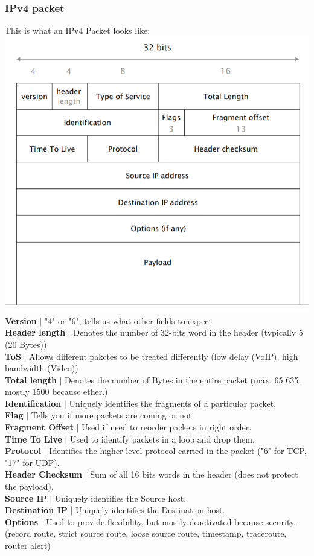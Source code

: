\documentclass[a4paper, fontsize=8pt, landscape, DIV=1]{scrartcl}
\begin{document}
\begin{multicols*}{4}
		\subsubsection{IPv4 packet}
		This is what an IPv4 Packet looks like:
		\includegraphics[width=\columnwidth]{images/Network_Layer/IPv4_packet.png}
		\textbf{Version} $\vert$  "4" or "6", tells us what other fields to
		expect\\ 
		\textbf{Header length} $\vert$ Denotes the number of 32-bits word in the
		header (typically 5 (20 Bytes)) \\ 
		\textbf{ToS} $\vert$ Allows different pakctes to be treated differently
		(low delay (VoIP), high bandwidth (Video))\\
		\textbf{Total length} $\vert$ Denotes the number of Bytes in the entire
		packet (max. 65 635, mostly 1500 because ether.)\\
		\textbf{Identification} $\vert$ Uniquely identifies the fragments of a
		particular packet.\\
		\textbf{Flag} $\vert$ Tells you if more packets are coming or not.\\
		\textbf{Fragment Offset} $\vert$ Used if need to reorder packets in right
		order.\\
		\textbf{Time To Live} $\vert$ Used to identify packets in a loop and drop
		them.\\
		\textbf{Protocol} $\vert$ Identifies the higher level protocol carried in
		the packet ("6" for TCP, "17" for UDP).\\
		\textbf{Header Checksum} $\vert$ Sum of all 16 bits words in the header
		(does not protect the payload).\\
		\textbf{Source IP} $\vert$ Uniquely identifies the Source host.\\
		\textbf{Destination IP} $\vert$ Uniquely identifies the Destination host.\\
		\textbf{Options} $\vert$ Used to provide flexibility, but mostly
		deactivated because security. (record route, strict source route, loose source
		route, timestamp, traceroute, router alert)
		

\end{multicols*}
\end{document}
